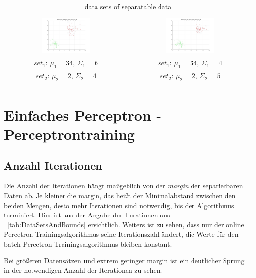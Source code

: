 \documentclass[]{report}
\begin{document}
\begin{table}[h]
\begin{tabular}{| c | c |}
\includegraphics[width=0.4\textwidth]{./images/DataSet_300.jpg} & \includegraphics[width=0.4\textwidth]{./images/DataSet_400.jpg} \\
$set_1$: $\mu_1=34$, $\Sigma_1=6$ & $set_1$: $\mu_1=34$, $\Sigma_1=4$ \\
$set_2$: $\mu_2=2$, $\Sigma_2=4$ & $set_2$: $\mu_2=2$, $\Sigma_2=5$ \\
 & \\
\hline
\end{tabular}
\caption{data sets of separatable data}
\label{tab:DataSets}
\end{table}

\chapter{Einfaches Perceptron - Perceptrontraining}

\section{Anzahl Iterationen}

Die Anzahl der Iterationen h\"angt ma{\ss}geblich von der \emph{margin} der separierbaren Daten ab. Je kleiner die margin, das hei{\ss}t der Minimalabstand zwischen den beiden Mengen, desto mehr Iterationen sind notwendig, bis der Algorithmus terminiert. Dies ist aus der Angabe der Iterationen aus ~\ref{tab:DataSetsAndBounds} ersichtlich. Weiters ist zu sehen, dass nur der online Percetron-Trainingsalgorithmus seine Iterationszahl \"andert, die Werte f\"ur den batch Percetron-Trainingsalgorithmus bleiben konstant.

Bei gr\"o{\ss}eren Datens\"atzen und extrem geringer margin ist ein deutlicher Sprung in der notwendigen Anzahl der Iterationen zu sehen. 
\end{document}
